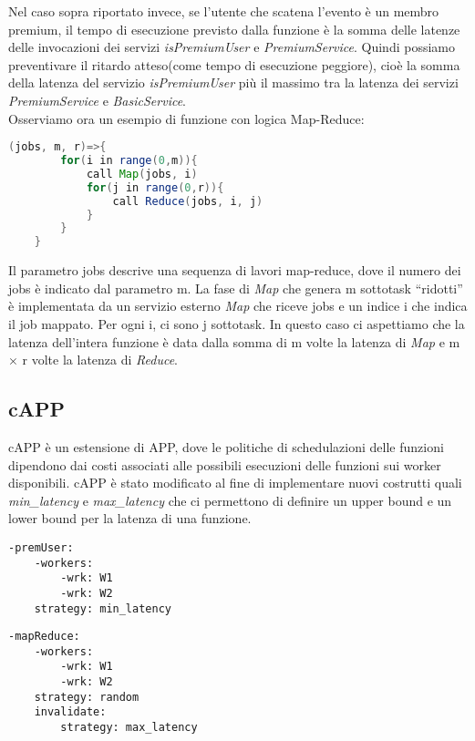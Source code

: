 \documentclass[../../main.tex]{subfiles}
\begin{document}
Nel caso sopra riportato invece, se l'utente che scatena l'evento è un membro premium, il tempo di esecuzione previsto dalla funzione è la somma delle latenze delle invocazioni dei servizi \textit{isPremiumUser} e \textit{PremiumService}.
Quindi possiamo preventivare il ritardo atteso(come tempo di esecuzione peggiore), cioè la somma della latenza del servizio \textit{isPremiumUser} più il massimo tra la latenza dei servizi \textit{PremiumService} e \textit{BasicService}.\\
Osserviamo ora un esempio di funzione con logica Map-Reduce:

\begin{lstlisting}[language=Java, caption=Funzione con logica Map-Reduce,label={lst:3}]
    (jobs, m, r)=>{
        for(i in range(0,m)){
            call Map(jobs, i)
            for(j in range(0,r)){
                call Reduce(jobs, i, j)
            }
        }
    }
\end{lstlisting}
Il parametro jobs descrive una sequenza di lavori map-reduce, dove il numero dei jobs è indicato dal parametro m.
La fase di \textit{Map} che genera m sottotask ``ridotti'' è implementata da un servizio esterno \textit{Map} che riceve jobs e un indice i che indica il job mappato.
Per ogni i, ci sono j sottotask.
In questo caso ci aspettiamo che la latenza dell'intera funzione è data dalla somma di m volte la latenza di \textit{Map} e m $\times $ r volte la latenza di \textit{Reduce}.\autocite{de2023custom}\\
\subsection{cAPP}
\label{cApp}
cAPP è un estensione di APP, dove le politiche di schedulazioni delle funzioni dipendono dai costi associati alle possibili esecuzioni delle funzioni sui worker disponibili\autocite {deserverless}.
cAPP è stato modificato al fine di implementare nuovi costrutti quali \textit{min\_latency} e \textit{max\_latency} che ci permettono di definire un upper bound e un lower bound per la latenza di una funzione.
\begin{multicols}{2}
    \begin{lstlisting}[caption={cAPP for Listing \ref{lst:1} e \ref{lst:2}},label={lst:4}]
-premUser:
    -workers:
        -wrk: W1
        -wrk: W2
    strategy: min_latency
    \end{lstlisting}
    \columnbreak
    \begin{lstlisting}[caption={cAPP for Listing~\ref{lst:3}}, label={lst:5}]
-mapReduce:
    -workers:
        -wrk: W1
        -wrk: W2
    strategy: random
    invalidate:
        strategy: max_latency
    \end{lstlisting}
\end{multicols}
\end{document}
